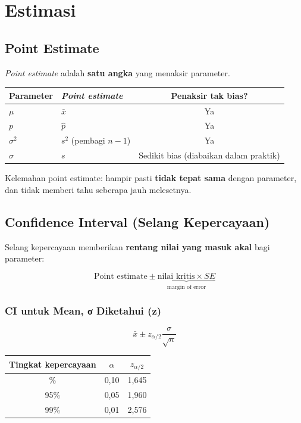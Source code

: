 \documentclass[
  indonesian,
  letterpaper,
]{book}
\newcounter{none} %
\begin{document}
\section{Estimasi}\label{estimasi}

\subsection{Point Estimate}\label{point-estimate}

\emph{Point estimate} adalah \textbf{satu angka} yang menaksir
parameter.

{\def\LTcaptype{none} %
\begin{longtable}[]{@{}llc@{}}
\toprule\noalign{}
Parameter & \emph{Point estimate} & Penaksir tak bias? \\
\midrule\noalign{}
\endhead
\bottomrule\noalign{}
\endlastfoot
\(\mu\) & \(\bar{x}\) & Ya \\
\(p\) & \(\hat{p}\) & Ya \\
\(\sigma^2\) & \(s^2\) (pembagi \(n - 1\)) & Ya \\
\(\sigma\) & \(s\) & Sedikit bias (diabaikan dalam praktik) \\
\end{longtable}
}

Kelemahan point estimate: hampir pasti \textbf{tidak tepat sama} dengan
parameter, dan tidak memberi tahu seberapa jauh melesetnya.

\subsection{Confidence Interval (Selang
Kepercayaan)}\label{confidence-interval-selang-kepercayaan}

Selang kepercayaan memberikan \textbf{rentang nilai yang masuk akal}
bagi parameter:

\[\text{Point estimate} \pm \underbrace{\text{nilai kritis} \times SE}_{\text{margin of error}}\]

\subsubsection{CI untuk Mean, σ Diketahui
(z)}\label{ci-untuk-mean-ux3c3-diketahui-z}

\[\bar{x} \pm z_{\alpha/2} \frac{\sigma}{\sqrt{n}}\]

{\def\LTcaptype{none} %
\begin{longtable}[]{@{}ccc@{}}
\toprule\noalign{}
Tingkat kepercayaan & \(\alpha\) & \(z_{\alpha/2}\) \\
\midrule\noalign{}
\endhead
\bottomrule\noalign{}
\endlastfoot
90\% & 0,10 & 1,645 \\
95\% & 0,05 & 1,960 \\
99\% & 0,01 & 2,576 \\
\end{longtable}
}
\end{document}
